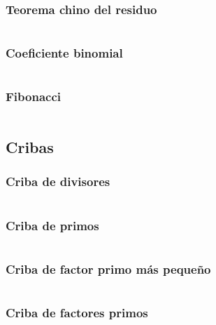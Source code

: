 \documentclass[11pt]{article}
\begin{document}
			\subsubsection{Teorema chino del residuo}
			\inputminted[tabsize=2,breaklines,firstline=108,lastline=117,fontsize=\small]{c++}{numberTheory.cpp}
			
			\subsubsection{Coeficiente binomial}
			\inputminted[tabsize=2,breaklines,firstline=450,lastline=458,fontsize=\small]{c++}{numberTheory.cpp}
			
			\subsubsection{Fibonacci}
			\inputminted[tabsize=2,breaklines,firstline=751,lastline=776,fontsize=\small]{c++}{numberTheory.cpp}
		
		\subsection{Cribas}
			\subsubsection{Criba de divisores}
			\inputminted[tabsize=2,breaklines,firstline=119,lastline=130,fontsize=\small]{c++}{numberTheory.cpp}
			
			\subsubsection{Criba de primos}
			\inputminted[tabsize=2,breaklines,firstline=132,lastline=149,fontsize=\small]{c++}{numberTheory.cpp}
			
			\subsubsection{Criba de factor primo más pequeño}
			\inputminted[tabsize=2,breaklines,firstline=151,lastline=164,fontsize=\small]{c++}{numberTheory.cpp}
			
			\subsubsection{Criba de factores primos}
			\inputminted[tabsize=2,breaklines,firstline=166,lastline=175,fontsize=\small]{c++}{numberTheory.cpp}
			
\end{document}
